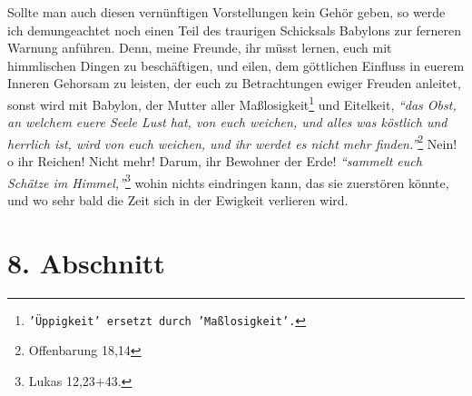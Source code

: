 \medskip

Sollte man auch diesen vernünftigen Vorstellungen kein Gehör geben, so werde ich
demungeachtet noch einen Teil des traurigen Schicksals Babylons zur ferneren
Warnung anführen. Denn, meine Freunde, ihr müsst lernen, euch mit himmlischen
Dingen zu beschäftigen, und eilen, dem göttlichen Einfluss in euerem Inneren
Gehorsam zu leisten, der euch zu Betrachtungen ewiger Freuden anleitet, sonst
wird mit Babylon, der Mutter aller
Maßlosigkeit\footnote{\texttt{'Üppigkeit' ersetzt durch 'Maßlosigkeit'.}} und
Eitelkeit,
\textit{"`das Obst, an
welchem euere Seele Lust hat, von euch weichen, und alles was köstlich und
herrlich ist, wird von euch weichen, und ihr werdet es nicht mehr
finden."'}\footnote{Offenbarung 18,14}
Nein! o ihr Reichen! Nicht mehr! Darum, ihr
Bewohner der Erde!
\textit{"`sammelt euch Schätze im Himmel,"'}\footnote{Lukas 12,23+43.}
wohin nichts eindringen kann, das sie zuerstören könnte, und wo sehr bald die
Zeit sich in der Ewigkeit verlieren wird.

\section{8. Abschnitt} \label{kap18_ab8}

